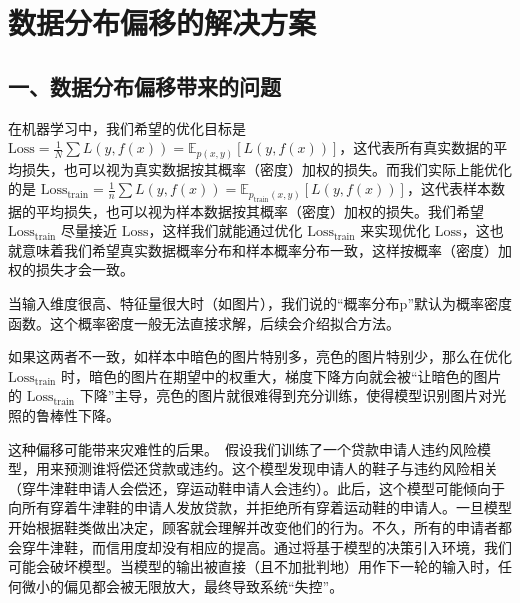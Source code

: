 \setcounter{section}{4}

\hypertarget{ux6570ux636eux5206ux5e03ux504fux79fbux7684ux89e3ux51b3ux65b9ux6848}{%
\section{数据分布偏移的解决方案}\label{ux6570ux636eux5206ux5e03ux504fux79fbux7684ux89e3ux51b3ux65b9ux6848}}

\hypertarget{ux4e00ux6570ux636eux5206ux5e03ux504fux79fbux5e26ux6765ux7684ux95eeux9898}{%
\subsection{一、数据分布偏移带来的问题}\label{ux4e00ux6570ux636eux5206ux5e03ux504fux79fbux5e26ux6765ux7684ux95eeux9898}}

在机器学习中，我们希望的优化目标是 \(\mathrm{Loss}=\frac{1}{N}\sum L(y,f(x))=\mathbb{E}_{p(x,y)}[L(y,f(x))]\)，这代表所有真实数据的平均损失，也可以视为真实数据按其概率（密度）加权的损失。而我们实际上能优化的是 \(\mathrm{Loss}_{\mathrm{train}}=\frac{1}{n}\sum L(y,f(x))=\mathbb{E}_{p_{\mathrm{train}}(x,y)}[L(y,f(x))]\)，这代表样本数据的平均损失，也可以视为样本数据按其概率（密度）加权的损失。我们希望 \(\mathrm{Loss}_{\mathrm{train}}\) 尽量接近 \(\mathrm{Loss}\)，这样我们就能通过优化 \(\mathrm{Loss}_{\mathrm{train}}\) 来实现优化 \(\mathrm{Loss}\)，这也就意味着我们希望真实数据概率分布和样本概率分布一致，这样按概率（密度）加权的损失才会一致。

当输入维度很高、特征量很大时（如图片），我们说的``概率分布p''默认为概率密度函数。这个概率密度一般无法直接求解，后续会介绍拟合方法。

如果这两者不一致，如样本中暗色的图片特别多，亮色的图片特别少，那么在优化 \(\mathrm{Loss}_{\mathrm{train}}\) 时，暗色的图片在期望中的权重大，梯度下降方向就会被``让暗色的图片的 \(\mathrm{Loss}_{\mathrm{train}}\) 下降''主导，亮色的图片就很难得到充分训练，使得模型识别图片对光照的鲁棒性下降。

这种偏移可能带来灾难性的后果。~假设我们训练了一个贷款申请人违约风险模型，用来预测谁将偿还贷款或违约。这个模型发现申请人的鞋子与违约风险相关（穿牛津鞋申请人会偿还，穿运动鞋申请人会违约）。此后，这个模型可能倾向于向所有穿着牛津鞋的申请人发放贷款，并拒绝所有穿着运动鞋的申请人。一旦模型开始根据鞋类做出决定，顾客就会理解并改变他们的行为。不久，所有的申请者都会穿牛津鞋，而信用度却没有相应的提高。通过将基于模型的决策引入环境，我们可能会破坏模型。当模型的输出被直接（且不加批判地）用作下一轮的输入时，任何微小的偏见都会被无限放大，最终导致系统``失控''。

